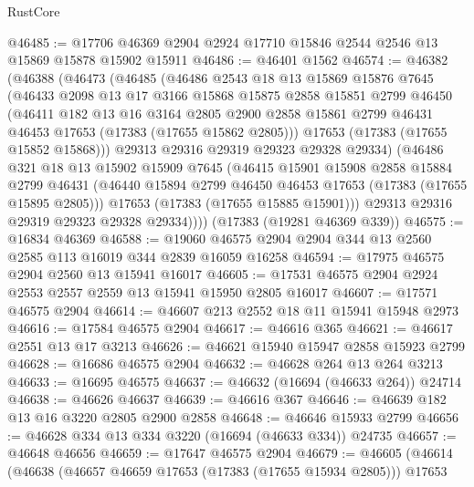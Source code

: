 \begin{lexlean}{RustCore}
\begin{coremodule}
@46485 := @17706 @46369 @2904 @2924 @17710 @15846 @2544 @2546 @13 @15869 @15878 @15902 @15911
@46486 := @46401 @1562
@46574 := @46382
    (@46388
      (@46473
        (@46485
          (@46486
            @2543
            @18
            @13
            @15869
            @15876
            @7645
            (@46433
              @2098
              @13
              @17
              @3166
              @15868
              @15875
              @2858
              @15851
              @2799
              @46450
              (@46411
                @182
                @13
                @16
                @3164
                @2805
                @2900
                @2858
                @15861
                @2799
                @46431
                @46453
                @17653
                (@17383 (@17655 @15862 @2805)))
              @17653
              (@17383 (@17655 @15852 @15868)))
            @29313
            @29316
            @29319
            @29323
            @29328
            @29334)
          (@46486
            @321
            @18
            @13
            @15902
            @15909
            @7645
            (@46415
              @15901
              @15908
              @2858
              @15884
              @2799
              @46431
              (@46440 @15894 @2799 @46450 @46453 @17653 (@17383 (@17655 @15895 @2805)))
              @17653
              (@17383 (@17655 @15885 @15901)))
            @29313
            @29316
            @29319
            @29323
            @29328
            @29334))))
    (@17383 (@19281 @46369 @339))
@46575 := @16834 @46369
@46588 := @19060 @46575 @2904 @2904 @344 @13 @2560 @2585 @113 @16019 @344 @2839 @16059 @16258
@46594 := @17975 @46575 @2904 @2560 @13 @15941 @16017
@46605 := @17531 @46575 @2904 @2924 @2553 @2557 @2559 @13 @15941 @15950 @2805 @16017
@46607 := @17571 @46575 @2904
@46614 := @46607 @213 @2552 @18 @11 @15941 @15948 @2973
@46616 := @17584 @46575 @2904
@46617 := @46616 @365
@46621 := @46617 @2551 @13 @17 @3213
@46626 := @46621 @15940 @15947 @2858 @15923 @2799
@46628 := @16686 @46575 @2904
@46632 := @46628 @264 @13 @264 @3213
@46633 := @16695 @46575
@46637 := @46632 (@16694 (@46633 @264)) @24714
@46638 := @46626 @46637
@46639 := @46616 @367
@46646 := @46639 @182 @13 @16 @3220 @2805 @2900 @2858
@46648 := @46646 @15933 @2799
@46656 := @46628 @334 @13 @334 @3220 (@16694 (@46633 @334)) @24735
@46657 := @46648 @46656
@46659 := @17647 @46575 @2904
@46679 := @46605
    (@46614
      (@46638
        (@46657 @46659 @17653 (@17383 (@17655 @15934 @2805)))
        @17653

\end{coremodule}
\end{lexlean}
